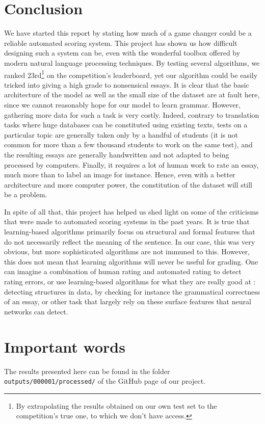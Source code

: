 \documentclass[a4paper,12pt,english]{article}
\begin{document}
\section{Conclusion}
We have started this report by stating how much of a game changer could be a reliable automated scoring system. This project has shown us how difficult designing such a system can be, even with the wonderful toolbox offered by modern natural language processing techniques. By testing several algorithms, we ranked 23rd\footnote{By extrapolating the results obtained on our own test set to the competition's true one, to which we don't have access.} on the competition's leaderboard, yet our algorithm could be easily tricked into giving a high grade to nonsensical essays. It is clear that the basic architecture of the model as well as the small size of the dataset are at fault here, since we cannot reasonably hope for our model to learn grammar. However, gathering more data for such a task is very costly. Indeed, contrary to translation tasks where huge databases can be constituted using existing texts, tests on a particular topic are generally taken only by a handful of students (it is not common for more than a few thousand students to work on the same test), and the resulting essays are generally handwritten and not adapted to being processed by computers. Finally, it requires a lot of human work to rate an essay, much more than to label an image for instance. Hence, even with a better architecture and more computer power, the constitution of the dataset will still be a problem.\par
In spite of all that, this project has helped us shed light on some of the criticisms that were made to automated scoring systems in the past years. It is true that learning-based algorithms primarily focus on structural and formal features that do not necessarily reflect the meaning of the sentence. In our case, this was very obvious, but more sophisticated algorithms are not immuned to this. However, this does not mean that learning algorithms will never be useful for grading. One can imagine a combination of human rating and automated rating to detect rating errors, or use learning-based algorithms for what they are really good at : detecting structures in data, by checking for instance the grammatical correctness of an essay, or other task that largely rely on these surface features that neural networks can detect.

\appendix
\newpage
\section{Important words}
\label{pos:importantwords}
The results presented here can be found in the folder \verb+outputs/000001/processed/+ of the GitHub page of our project.
\end{document}
